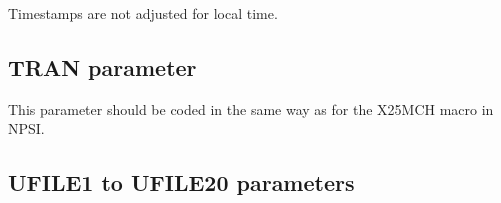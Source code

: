 \documentclass[letterpaper,10pt,english]{sphinxmanual}
\begin{document}
\sphinxAtStartPar
{} \sphinxhyphen{} Timestamps are not adjusted for local time.

\ignorespaces 

\subsection{TRAN parameter}
\label{\detokenize{Installation_Guide:tran-parameter}}\label{\detokenize{Installation_Guide:index-133}}
\begin{sphinxVerbatim}[commandchars=\\\{\}]
 
\end{sphinxVerbatim}

\sphinxAtStartPar
This parameter should be coded in the same way as for the X25MCH macro in NPSI.

\ignorespaces 

\subsection{UFILE1 to UFILE20 parameters}
\label{\detokenize{Installation_Guide:ufile1-to-ufile20-parameters}}\label{\detokenize{Installation_Guide:v461ig-ufile1-to-ufile20-parameters}}\label{\detokenize{Installation_Guide:index-134}}
\begin{sphinxVerbatim}[commandchars=\\\{\}]
 
\end{sphinxVerbatim}
\end{document}
